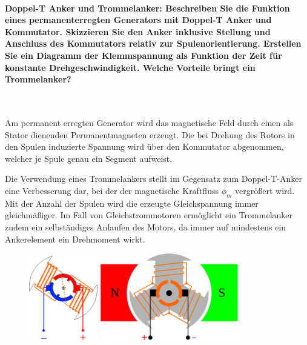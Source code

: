\documentclass[a4paper, 11pt, parskip=half]{scrartcl}
\begin{document}
\paragraph{Doppel-T Anker und Trommelanker: Beschreiben Sie die Funktion eines permanenterregten
Generators mit Doppel-T Anker und Kommutator. Skizzieren Sie den Anker inklusive Stellung und
Anschluss des Kommutators relativ zur Spulenorientierung. Erstellen Sie ein Diagramm der
Klemmspannung als Funktion der Zeit für konstante Drehgeschwindigkeit. Welche Vorteile bringt ein
Trommelanker?} ~

Am permanent erregten Generator wird das magnetische Feld durch einen als Stator dienenden
Permanentmagneten erzeugt. Die bei Drehung des Rotors in den Spulen induzierte Spannung wird über
den Kommutator abgenommen, welcher je Spule genau ein Segment aufweist.

Die Verwendung eines Trommelankers stellt im Gegensatz zum Doppel-T-Anker eine Verbesserung dar,
bei der der magnetische Kraftfluss $\phi_m$ vergrößert wird. Mit der Anzahl der Spulen wird die
erzeugte Gleichspannung immer gleichmäßiger. Im Fall von Gleichstrommotoren ermöglicht ein
Trommelanker zudem ein selbständiges Anlaufen des Motors, da immer auf mindestens ein Ankerelement
ein Drehmoment wirkt.

\begin{figure}[H]
    \centering
    \begin{minipage}[b]{0.3\textwidth}
        \centering
        \includegraphics[width=3cm]{image/8/2.1}
    \end{minipage}
    \hspace{2cm}
    \begin{minipage}[b]{0.3\textwidth}
        \centering
        \includegraphics[width=6cm]{image/8/2.2}
    \end{minipage}
\end{figure}
\end{document}

